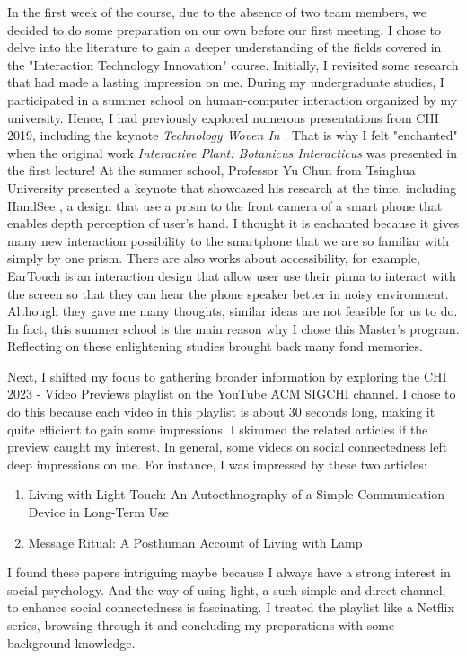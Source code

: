In the first week of the course, due to the absence of two team members, we decided to do some preparation on our own before our first meeting. I chose to delve into the literature to gain a deeper understanding of the fields covered in the "Interaction Technology Innovation" course. Initially, I revisited some research that had made a lasting impression on me. During my undergraduate studies, I participated in a summer school on human-computer interaction organized by my university. Hence, I had previously explored numerous presentations from CHI 2019, including the keynote \textit{Technology Woven In} \cite{poupyrev_2019_chi}. That is why I felt "enchanted" when the original work \textit{Interactive Plant: Botanicus Interacticus} \cite{botanicus} was presented in the first lecture! At the summer school, Professor Yu Chun from Tsinghua University presented a keynote that showcased his research at the time, including HandSee \cite{yu2019handsee}, a design that use a prism to the front camera of a smart phone that enables depth perception of user's hand. I thought it is enchanted because it gives many new interaction possibility to the smartphone that we are so familiar with simply by one prism. There are also works about accessibility, for example, EarTouch \cite{kikuchi2017eartouch} is an interaction design that allow user use their pinna to interact with the screen so that they can hear the phone speaker better in noisy environment. Although they gave me many thoughts, similar ideas are not feasible for us to do. 
In fact, this summer school is the main reason why I chose this Master's program. Reflecting on these enlightening studies brought back many fond memories.

Next, I shifted my focus to gathering broader information by exploring the CHI 2023 - Video Previews playlist on the YouTube ACM SIGCHI channel. I chose to do this because each video in this playlist is about 30 seconds long, making it quite efficient to gain some impressions. I skimmed the related articles if the preview caught my interest. In general, some videos on social connectedness left deep impressions on me. For instance, I was impressed by these two articles:

\begin{enumerate}
    \item Living with Light Touch: An Autoethnography of a Simple Communication Device in Long-Term Use \cite{Livingwithlight}
    \item Message Ritual: A Posthuman Account of Living with Lamp \cite{messageritual}
\end{enumerate}

I found these papers intriguing maybe because I always have a strong interest in social psychology. And the way of using light, a such simple and direct channel, to enhance social connectedness is fascinating. I treated the playlist like a Netflix series, browsing through it and concluding my preparations with some background knowledge.

